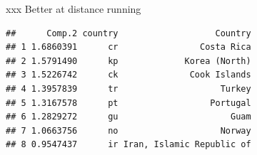 \documentclass[ignorenonframetext,]{beamer}
\newenvironment{Shaded}{\begin{snugshade}}{\end{snugshade}}
\newcommand{\DataTypeTok}[1]{\textcolor[rgb]{0.13,0.29,0.53}{#1}}
\newcommand{\DecValTok}[1]{\textcolor[rgb]{0.00,0.00,0.81}{#1}}
\newcommand{\FloatTok}[1]{\textcolor[rgb]{0.00,0.00,0.81}{#1}}
\newcommand{\KeywordTok}[1]{\textcolor[rgb]{0.13,0.29,0.53}{\textbf{#1}}}
\newcommand{\NormalTok}[1]{#1}
\newcommand{\OperatorTok}[1]{\textcolor[rgb]{0.81,0.36,0.00}{\textbf{#1}}}
\newcommand{\StringTok}[1]{\textcolor[rgb]{0.31,0.60,0.02}{#1}}
\begin{document}
\begin{frame}[fragile]{xxx Better at distance running}
\protect\hypertarget{xxx-better-at-distance-running}{}

\begin{Shaded}
\end{Shaded}

\begin{verbatim}
##      Comp.2 country                   Country
## 1 1.6860391      cr                Costa Rica
## 2 1.5791490      kp             Korea (North)
## 3 1.5226742      ck              Cook Islands
## 4 1.3957839      tr                    Turkey
## 5 1.3167578      pt                  Portugal
## 6 1.2829272      gu                      Guam
## 7 1.0663756      no                    Norway
## 8 0.9547437      ir Iran, Islamic Republic of
\end{verbatim}

\end{frame}
\end{document}
